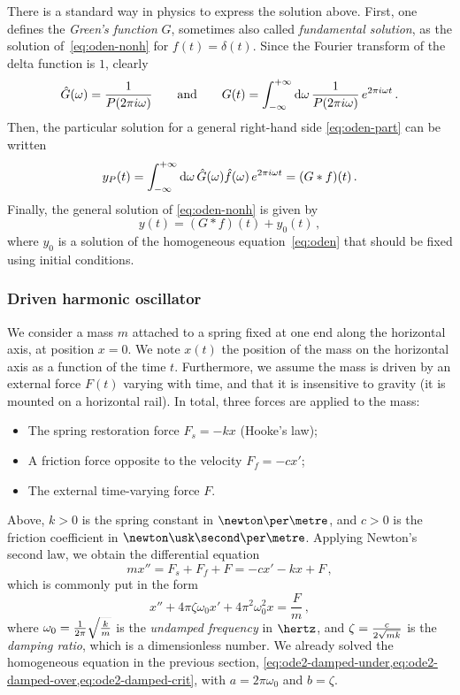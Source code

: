 There is a standard way in physics to express the solution above. First, one defines the
\emph{Green's function} $G$, sometimes also called \emph{fundamental solution}, as the
solution of~\cref{eq:oden-nonh} for $f(t)=\delta(t)$. Since the Fourier transform of the
delta function is $1$, clearly
\begin{equation}
  \hat{G}(\omega)=\frac{1}{P(2\pi i\omega)}\qquad\text{and}\qquad
  G(t)=\int_{-\infty}^{+\infty}\mathrm{d}{\omega}\,\frac{1}{P(2\pi i\omega)}\,e^{2\pi i \omega t}\,.
  \label{eq:green-ft}
\end{equation}
Then, the particular solution for a general right-hand side \cref{eq:oden-part} can be
written
\begin{equation}
  \label{eq:oden-part-conv}
  y_P(t)=\int_{-\infty}^{+\infty}\mathrm{d}{\omega}\,\hat{G}(\omega)\hat{f}(\omega)\,e^{2\pi i\omega t}
  =(G\ast f)(t)\,.
\end{equation}
Finally, the general solution of \cref{eq:oden-nonh} is given by
\begin{equation}
  y(t)=(G\ast f)(t)+y_0(t)\,,
\end{equation}
where $y_0$ is a solution of the homogeneous equation~\cref{eq:oden} that should be fixed
using initial conditions.
\subsubsection{Driven harmonic oscillator}
We consider a mass $m$ attached to a spring fixed at one end along the horizontal axis, at
position $x=0$. We note $x(t)$ the position of the mass on the horizontal axis as a
function of the time $t$. Furthermore, we assume the mass is driven by an external force
$F(t)$ varying with time, and that it is insensitive to gravity (\eg it is mounted on a
horizontal rail). In total, three forces are applied to the mass:
\begin{itemize}
  \item The spring restoration force $F_s=-kx$ (Hooke's law);
  \item A friction force opposite to the velocity $F_f=-cx'$;
  \item The external time-varying force $F$.
\end{itemize}
Above, $k>0$ is the spring constant in $\newton\per\metre$, and $c>0$ is the friction
coefficient in $\newton\usk\second\per\metre$. Applying Newton's second law, we obtain the
differential equation
\begin{equation}
  mx''=F_s+F_f+F=-cx'-kx+F\,,
\end{equation}
which is commonly put in the form
\begin{equation}
  x''+4\pi\zeta\omega_0x'+4\pi^2\omega_0^2x=\frac{F}{m}\,,\label{eq:ode2-driven}
\end{equation}
where $\omega_0=\smash{\frac{1}{2\pi}\sqrt{\frac{k}{m}}}$ is the \emph{undamped frequency}
in $\hertz$, and $\zeta=\smash{\frac{c}{2\sqrt{mk}}}$ is the \emph{damping ratio}, which
is a dimensionless number. We already solved the homogeneous equation in the previous
section, \cf \cref{eq:ode2-damped-under,eq:ode2-damped-over,eq:ode2-damped-crit}, with
$a=2\pi\omega_0$ and $b=\zeta$.

